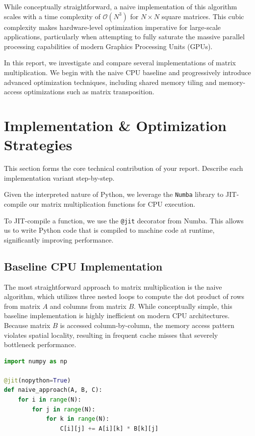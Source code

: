 \documentclass[11pt,a4paper]{article}
\begin{document}
While conceptually straightforward, a naive implementation of this algorithm scales with a time complexity of $\mathcal{O}(N^3)$ for $N \times N$ square matrices. This cubic complexity makes hardware-level optimization imperative for large-scale applications, particularly when attempting to fully saturate the massive parallel processing capabilities of modern Graphics Processing Units (GPUs). 

In this report, we investigate and compare several implementations of matrix multiplication. We begin with the naive CPU baseline and progressively introduce advanced optimization techniques, including shared memory tiling and memory-access optimizations such as matrix transposition.
\section{Implementation \& Optimization Strategies}
\label{sec:implementation}
This section forms the core technical contribution of your report. Describe each implementation variant step-by-step.

Given the interpreted nature of Python, we leverage the \texttt{Numba} library to JIT-compile our matrix multiplication functions for CPU execution.

To JIT-compile a function, we use the \texttt{@jit} decorator from Numba. This allows us to write Python code that is compiled to machine code at runtime, significantly improving performance.
\subsection{Baseline CPU Implementation}
The most straightforward approach to matrix multiplication is the naive algorithm, which utilizes three nested loops to compute the dot product of rows from matrix $A$ and columns from matrix $B$. While conceptually simple, this baseline implementation is highly inefficient on modern CPU architectures. Because matrix $B$ is accessed column-by-column, the memory access pattern violates spatial locality, resulting in frequent cache misses that severely bottleneck performance.
\begin{lstlisting}[language=Python, caption={Baseline Naive CPU Matrix Multiplication in Python}, label={lst:cpu_baseline}]
import numpy as np

@jit(nopython=True)
def naive_approach(A, B, C):
    for i in range(N):
        for j in range(N):
            for k in range(N):
                C[i][j] += A[i][k] * B[k][j]


\end{lstlisting}
\end{document}
